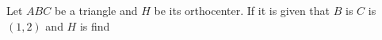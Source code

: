 Let $ABC$ be a triangle and $H$ be its orthocenter. If it is given that $B$ is  $C$ is $(1,2)$ and $H$ is  find 